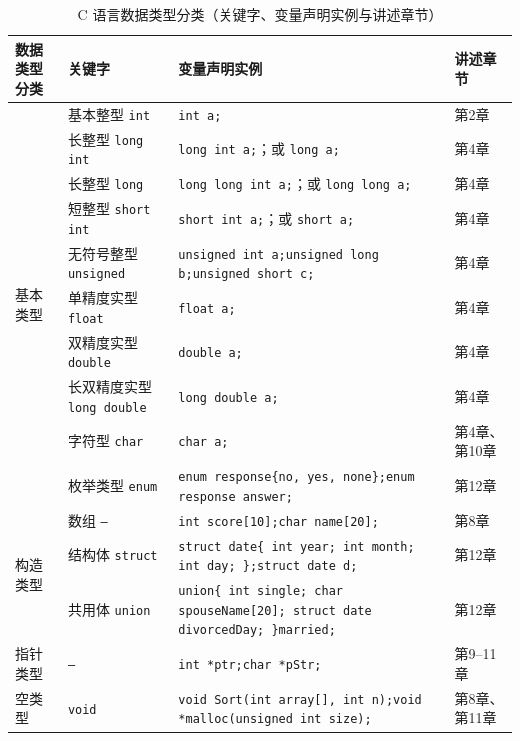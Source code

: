 \begin{table}[htbp]
\centering
\caption{C 语言数据类型分类（关键字、变量声明实例与讲述章节）}
\footnotesize
\setlength{\tabcolsep}{3pt}
\begin{tabularx}{\textwidth}{@{}p{1.9cm}p{2.6cm}Xp{1.5cm}@{}}
\toprule
数据类型分类 & 关键字 & 变量声明实例 & 讲述章节 \\
\midrule
\multirow{10}{*}{基本类型}
 & 基本整型 \texttt{int} & \texttt{int a;} & 第2章 \\
 & 长整型 \texttt{long int} & \texttt{long int a;}；或 \texttt{long a;} & 第4章 \\
 & 长整型 \texttt{long} & \texttt{long long int a;}；或 \texttt{long long a;} & 第4章 \\
 & 短整型 \texttt{short int} & \texttt{short int a;}；或 \texttt{short a;} & 第4章 \\
 & 无符号整型 \texttt{unsigned} & \texttt{unsigned int a;}\newline \texttt{unsigned long b;}\newline \texttt{unsigned short c;} & 第4章 \\
\cmidrule(l){2-4}
 & 单精度实型 \texttt{float} & \texttt{float a;} & 第4章 \\
 & 双精度实型 \texttt{double} & \texttt{double a;} & 第4章 \\
 & 长双精度实型 \texttt{long double} & \texttt{long double a;} & 第4章 \\
\cmidrule(l){2-4}
 & 字符型 \texttt{char} & \texttt{char a;} & 第4章、第10章 \\
 & 枚举类型 \texttt{enum} & \texttt{enum response\{no, yes, none\};}\newline \texttt{enum response answer;} & 第12章 \\
\midrule
\multirow{3}{*}{构造类型}
 & 数组 \texttt{--} & \texttt{int score[10];}\newline \texttt{char name[20];} & 第8章 \\
 & 结构体 \texttt{struct} & \texttt{struct date\{ int year; int month; int day; \};}\newline \texttt{struct date d;} & 第12章 \\
 & 共用体 \texttt{union} & \texttt{union\{ int single; char spouseName[20]; struct date divorcedDay; \}married;} & 第12章 \\
\midrule
指针类型 & \texttt{--} & \texttt{int *ptr;}\quad \texttt{char *pStr;} & 第9--11章 \\
空类型 & \texttt{void} & \texttt{void Sort(int array[], int n);}\newline \texttt{void *malloc(unsigned int size);} & 第8章、第11章 \\
\bottomrule
\end{tabularx}
\end{table}

